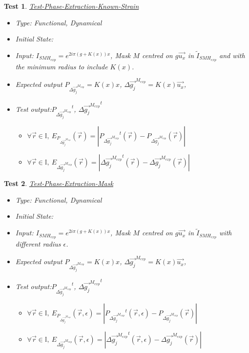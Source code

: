 \documentclass[12pt, titlepage]{article}
\newtheorem{Test}{Test}
\begin{document}
\begin{Test}\normalfont\underline{Test-Phase-Extraction-Known-Strain}
\label{T_Phase-Extraction-Known-Strain}
\begin{itemize}
\item Type: Functional, Dynamical
\item Initial State:
\item Input: $I_{SMH_{exp}}=e^{2i\pi (g+K(x))x}$, Mask $M$ centred on $g\overrightarrow{u_x}$ in $\widetilde{I}_{SMH_{exp}}$ and with the minimum radius to include $K(x)$. 
\item Expected output $P_{\Delta \overrightarrow{g_{j}}^{M_{exp}}}=K(x)x$, $\Delta \overrightarrow{g_{j}}^{M_{exp}}=K(x)\overrightarrow{u_x}$, 
\item Test output:${P_{\Delta \overrightarrow{g_{j}}^{M_{exp}}}}^{t}$, $\Delta {\overrightarrow{g_{j}}^{M_{exp}}}^{t}$
	\begin{itemize}
	\item $\forall \vec{r} \in \mathbb{I}, \ E_{P_{\Delta \overrightarrow{g_{j}}^{M_{exp}}}}(\vec{r})=|{P_{\Delta \overrightarrow{g_{j}}^{M_{exp}}}}^{t}(\vec{r})-P_{\Delta \overrightarrow{g_{j}}^{M_{exp}}}(\vec{r})|$
	\item $\forall \vec{r} \in \mathbb{I}, \ E_{\Delta {\overrightarrow{g_{j}}^{M_{exp}}}}(\vec{r})=|{\Delta {\overrightarrow{g_{j}}^{M_{exp}}}}^t(\vec{r})-{\Delta {\overrightarrow{g_{j}}^{M_{exp}}}}(\vec{r})|$
	\end{itemize}  
\end{itemize}
\end{Test}				
 
\begin{Test}\normalfont\underline{Test-Phase-Extraction-Mask}
\label{T_Phase-Extraction-Mask}
\begin{itemize}
\item Type: Functional, Dynamical
\item Initial State:
\item Input: $I_{SMH_{exp}}=e^{2i\pi (g+K(x))x}$, Mask $M$ centred on $g\overrightarrow{u_x}$ in $\widetilde{I}_{SMH_{exp}}$ with different radius $\epsilon$. 
\item Expected output $P_{\Delta \overrightarrow{g_{j}}^{M_{exp}}}=K(x)x$, $\Delta \overrightarrow{g_{j}}^{M_{exp}}=K(x)\overrightarrow{u_x}$, 
\item Test output:${P_{\Delta \overrightarrow{g_{j}}^{M_{exp}}}}^{t}$, $\Delta {\overrightarrow{g_{j}}^{M_{exp}}}^{t}$
	\begin{itemize}
	\item $\forall \vec{r} \in \mathbb{I}, \ E_{P_{\Delta \overrightarrow{g_{j}}^{M_{exp}}}}(\vec{r},\epsilon)=|{P_{\Delta \overrightarrow{g_{j}}^{M_{exp}}}}^{t}(\vec{r},\epsilon)-P_{\Delta \overrightarrow{g_{j}}^{M_{exp}}}(\vec{r})|$
	\item $\forall \vec{r} \in \mathbb{I}, \ E_{\Delta {\overrightarrow{g_{j}}^{M_{exp}}}}(\vec{r},\epsilon)=|{\Delta {\overrightarrow{g_{j}}^{M_{exp}}}}^t(\vec{r},\epsilon)-{\Delta {\overrightarrow{g_{j}}^{M_{exp}}}}(\vec{r})|$
	\end{itemize}
\end{itemize}
\end{Test}						
\end{document}
